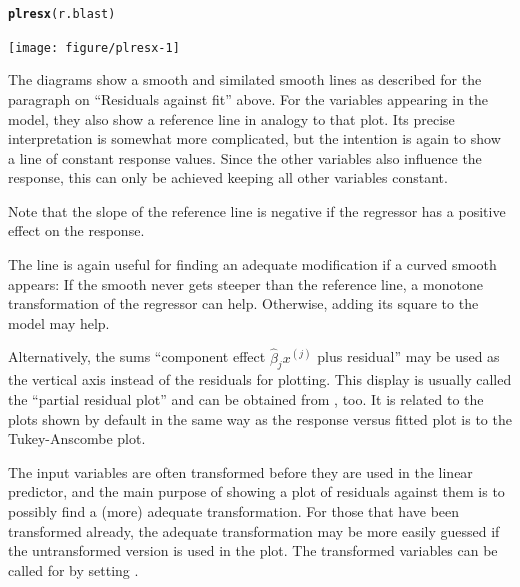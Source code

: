 \documentclass[11pt]{article}\usepackage[]{graphicx}\usepackage[]{color}
\makeatletter
\newcommand{\hlstd}[1]{\textcolor[rgb]{0.345,0.345,0.345}{#1}}%
\newcommand{\hlkwd}[1]{\textcolor[rgb]{0.737,0.353,0.396}{\textbf{#1}}}%
\newenvironment{kframe}{%
 \def\at@end@of@kframe{}%
 \ifinner\ifhmode%
  \def\at@end@of@kframe{\end{minipage}}%
  \begin{minipage}{\columnwidth}%
 \fi\fi%
 \def\FrameCommand##1{\hskip\@totalleftmargin \hskip-\fboxsep
 \colorbox{shadecolor}{##1}\hskip-\fboxsep
     \hskip-\linewidth \hskip-\@totalleftmargin \hskip\columnwidth}%
 \MakeFramed {\advance\hsize-\width
   \@totalleftmargin\z@ \linewidth\hsize
   \@setminipage}}%
 {\par\unskip\endMakeFramed%
 \at@end@of@kframe}
\newenvironment{knitrout}{}{} %
\makeatother
\begin{document}
\begin{knitrout}
\color{fgcolor}\begin{kframe}
\begin{alltt}
\hlkwd{plresx}\hlstd{(r.blast)}
\end{alltt}
\end{kframe}
\texttt{[image: figure/plresx-1]} 

\end{knitrout}
The diagrams show a smooth and similated smooth lines as described
for the paragraph on ``Residuals against fit'' above.
For the variables appearing in the model, they also show a reference line 
in analogy to that plot.
Its precise interpretation is somewhat more complicated, but the intention
is again to show a line of constant response values.
Since the other variables also influence the response, 
this can only be achieved keeping all other variables constant.


Note that the slope of the reference line is negative if the regressor has
a positive effect on the response.

The line is again useful for finding an adequate modification if a curved
smooth appears: If the smooth never gets steeper than the reference line,
a monotone transformation of the regressor can help. 
Otherwise, adding its square to the model may help.

Alternatively, the sums 
``component effect $\widehat\beta_j x^{(j)}$ plus residual''
may be used as the vertical axis instead of the
residuals for plotting. This display is usually called the 
``partial residual plot'' and can be obtained from , too. 
It is related to the plots shown by default in the same way as the
response versus fitted plot is to the Tukey-Anscombe plot.

The input variables are often transformed before they are used 
in the linear predictor,
and the main purpose of showing a plot of residuals against them is
to possibly find a (more) adequate transformation.
For those that have been transformed already, the adequate transformation 
may be more easily guessed if the untransformed version is used in the
plot. The transformed variables can be called for by setting
.
\end{document}
